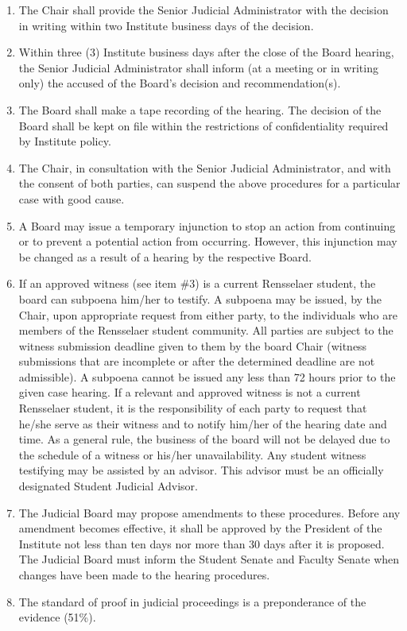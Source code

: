 \begin{enumerate}
\begin{enumerate}
    \end{enumerate}
    \item The Chair shall provide the Senior Judicial Administrator with the decision in writing within two Institute business days of the decision.
    \item Within three (3) Institute business days after the close of the Board hearing, the Senior Judicial Administrator shall inform (at a meeting or in writing only) the accused of the Board's decision and recommendation(s).
    \item The Board shall make a tape recording of the hearing. The decision of the Board shall be kept on file within the restrictions of confidentiality required by Institute policy.
    \item The Chair, in consultation with the Senior Judicial Administrator, and with the consent of both parties, can suspend the above procedures for a particular case with good cause.
    \item A Board may issue a temporary injunction to stop an action from continuing or to prevent a potential action from occurring. However, this injunction may be changed as a result of a hearing by the respective Board.
    \item If an approved witness (see item \#3) is a current Rensselaer student, the board can subpoena him/her to testify. A subpoena may be issued, by the Chair, upon appropriate request from either party, to the individuals who are members of the Rensselaer student community. All parties are subject to the witness submission deadline given to them by the board Chair (witness submissions that are incomplete or after the determined deadline are not admissible). A subpoena cannot be issued any less than 72 hours prior to the given case hearing. If a relevant and approved witness is not a current Rensselaer student, it is the responsibility of each party to request that he/she serve as their witness and to notify him/her of the hearing date and time. As a general rule, the business of the board will not be delayed due to the schedule of a witness or his/her unavailability. Any student witness testifying may be assisted by an advisor. This advisor must be an officially designated Student Judicial Advisor.
    \item The Judicial Board may propose amendments to these procedures. Before any amendment becomes effective, it shall be approved by the President of the Institute not less than ten days nor more than 30 days after it is proposed. The Judicial Board must inform the Student Senate and Faculty Senate when changes have been made to the hearing procedures.
    \item The standard of proof in judicial proceedings is a preponderance of the evidence (51\%).
\end{enumerate}

